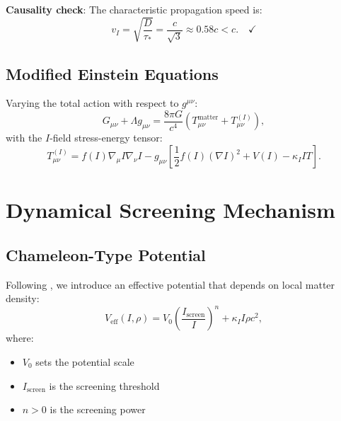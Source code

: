 \documentclass[12pt, a4paper]{article}
\begin{document}
\textbf{Causality check}: The characteristic propagation speed is:
\begin{equation}
    v_I = \sqrt{\frac{D}{\tau_*}} = \frac{c}{\sqrt{3}} \approx 0.58c < c. \quad \checkmark
\end{equation}

\subsection{Modified Einstein Equations}

Varying the total action with respect to $g^{\mu\nu}$:
\begin{equation}
    G_{\mu\nu} + \Lambda g_{\mu\nu} = \frac{8\pi G}{c^4} \left( T_{\mu\nu}^{\text{matter}} + T_{\mu\nu}^{(I)} \right),
    \label{eq:Einstein_modified}
\end{equation}
with the $I$-field stress-energy tensor:
\begin{equation}
    T_{\mu\nu}^{(I)} = f(I) \nabla_\mu I \nabla_\nu I - g_{\mu\nu} \left[ \frac{1}{2} f(I) (\nabla I)^2 + V(I) - \kappa_I I T \right].
    \label{eq:T_I}
\end{equation}


\section{Dynamical Screening Mechanism}

\subsection{Chameleon-Type Potential}

Following \cite{Khoury2004}, we introduce an effective potential that depends on local matter density:
\begin{equation}
    V_{\text{eff}}(I, \rho) = V_0 \left( \frac{I_{\text{screen}}}{I} \right)^n + \kappa_I I \rho c^2,
    \label{eq:V_eff}
\end{equation}
where:
\begin{itemize}
    \item $V_0$ sets the potential scale
    \item $I_{\text{screen}}$ is the screening threshold
    \item $n > 0$ is the screening power
\end{itemize}
\end{document}

